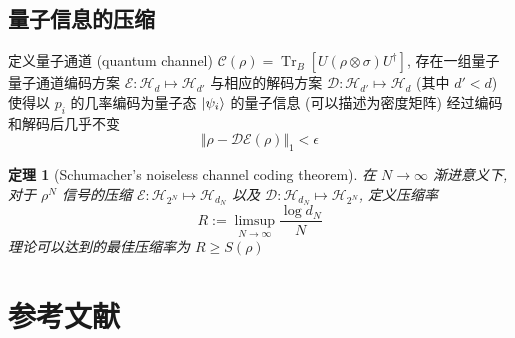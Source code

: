 \documentclass[12pt,a4paper]{article}
\newcommand{\Tr}{\operatorname{Tr}}
\newtheorem{theorem}{定理}
\begin{document}
\subsection{量子信息的压缩} %
\label{sub:Quantum_compression}
    定义量子通道 (quantum channel) $\mathscr C(\rho) = \Tr_B[U(\rho\otimes\sigma)U^\dagger]$, 
    存在一组量子量子通道编码方案 $\mathscr E:\mathcal H_d\mapsto\mathcal H_{d'}$ 
    与相应的解码方案 $\mathscr D:\mathcal H_{d'}\mapsto\mathcal H_d$ (其中 $d'<d$)
    使得以 $p_i$ 的几率编码为量子态 $\ket{\psi_i}$ 的量子信息 (可以描述为密度矩阵)
    经过编码和解码后几乎不变
    $$
    \Vert\rho - \mathscr D\mathscr E(\rho)\Vert_1<\epsilon
    $$
    \begin{theorem}[Schumacher’s noiseless channel coding theorem]
        在 $N\to\infty$ 渐进意义下, 对于 $\rho^N$ 信号的压缩
        $\mathscr E:\mathcal H_{2^N}\mapsto\mathcal H_{d_N}$ 以及
        $\mathscr D:\mathcal H_{d_N}\mapsto\mathcal H_{2^N}$, 定义压缩率
        \begin{equation}
            R := \limsup_{N\to\infty}\frac{\log d_N}{N}
        \end{equation}
        理论可以达到的最佳压缩率为 $R\ge S(\rho)$\cite{noisecodeing.PhysRevA.51.2738}
    \end{theorem}
\section{参考文献} %
\label{sec:参考文献}
    
    
\end{document}
